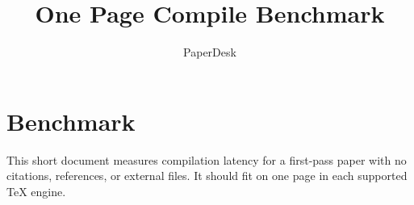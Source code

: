 \documentclass[11pt,a4paper]{article}
\title{One Page Compile Benchmark}
\author{PaperDesk}
\date{}
\begin{document}
\maketitle
\section{Benchmark}
This short document measures compilation latency for a first-pass paper with no citations, references, or external files. It should fit on one page in each supported TeX engine.
\end{document}
